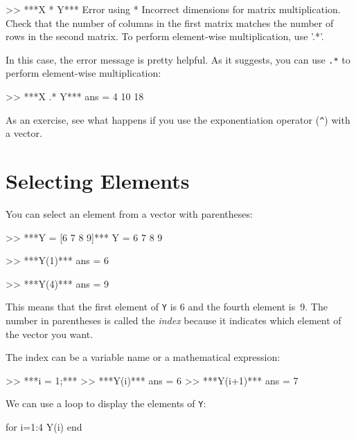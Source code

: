 \begin{code}
>> ***X * Y***
Error using  * 
Incorrect dimensions for matrix multiplication. 
Check that the number of columns in the first matrix 
matches the number of rows in the second matrix.
To perform element-wise multiplication, use '.*'.
\end{code}

In this case, the error message is pretty helpful.  As it suggests, you can use \lstinline{.*} to perform element-wise multiplication:


\begin{code}
>> ***X .* Y***
ans = 4    10    18
\end{code}

As an exercise, see what happens if you use the exponentiation operator 
(\lstinline{^}) with a vector.

\section{Selecting Elements}


You can select an element from a vector with parentheses:

\begin{code}
>> ***Y = [6 7 8 9]***
Y = 6    7     8     9

>> ***Y(1)***
ans = 6

>> ***Y(4)***
ans = 9
\end{code}

This means that the first element of \lstinline{Y} is 6 and the
fourth element is~9.
The number in parentheses is called the \emph{index} because it indicates which element of the vector you want.


The index can be a variable name or a mathematical expression:

\begin{code}
>> ***i = 1;***
>> ***Y(i)***
ans = 6
>> ***Y(i+1)***
ans = 7
\end{code}

We can use a loop to display the elements of \lstinline{Y}:


\begin{code}
for i=1:4
     Y(i)
end
\end{code}


